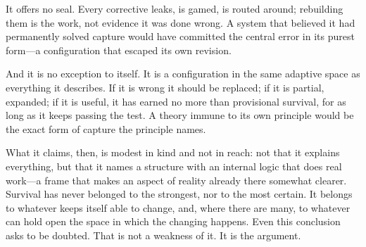\documentclass[11pt]{article}
\begin{document}
It offers no seal. Every corrective leaks, is gamed, is routed around; rebuilding them is the work, not evidence it was done wrong. A system that believed it had permanently solved capture would have committed the central error in its purest form---a configuration that escaped its own revision.

And it is no exception to itself. It is a configuration in the same adaptive space as everything it describes. If it is wrong it should be replaced; if it is partial, expanded; if it is useful, it has earned no more than provisional survival, for as long as it keeps passing the test. A theory immune to its own principle would be the exact form of capture the principle names.

What it claims, then, is modest in kind and not in reach: not that it explains everything, but that it names a structure with an internal logic that does real work---a frame that makes an aspect of reality already there somewhat clearer. Survival has never belonged to the strongest, nor to the most certain. It belongs to whatever keeps itself able to change, and, where there are many, to whatever can hold open the space in which the changing happens. Even this conclusion asks to be doubted. That is not a weakness of it. It is the argument.
\end{document}
